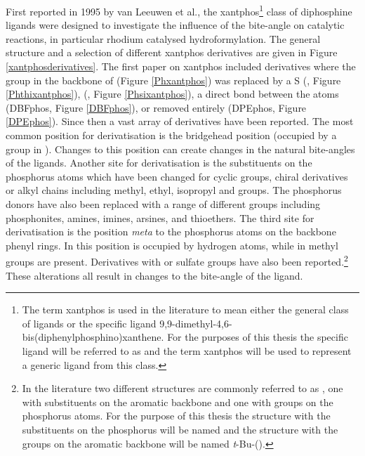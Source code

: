 First reported in 1995 by van Leeuwen et al., the \acrshort{xantphos}\footnote{The term xantphos is used in the literature to mean either the general class of ligands or the specific ligand 9,9-dimethyl-4,6-bis(diphenylphosphino)xanthene.  For the purposes of this thesis the specific ligand will be referred to as \Phxantphos{} and the term xantphos will be used to represent a generic ligand from this class.} class of diphosphine ligands were designed to investigate the influence of the bite-angle on catalytic reactions, in particular rhodium catalysed hydroformylation.\cite{Kranenburg1995}  The general structure and a selection of different xantphos derivatives are given in Figure \ref{xantphosderivatives}.  The first paper on xantphos included derivatives where the  group in the backbone of \Phxantphos{} (Figure \ref{Phxantphos}) was replaced by a S (\Phthixantphos, Figure \ref{Phthixantphos}),  (\Phsixantphos, Figure \ref{Phsixantphos}), a direct bond between the atoms (DBFphos, Figure \ref{DBFphos}), or removed entirely (DPEphos, Figure \ref{DPEphos}).  Since then a vast array of derivatives have been reported.  The most common position for derivatisation is the bridgehead position (occupied by a  group in \Phxantphos{}).  Changes to this position can create changes in the natural bite-angles of the ligands.  Another site for derivatisation is the substituents on the phosphorus atoms which have been changed for cyclic groups, chiral derivatives or alkyl chains including methyl, ethyl, isopropyl and \tBu{} groups.  The phosphorus donors have also been replaced with a range of different groups including phosphonites, amines, imines, arsines, and thioethers.\cite{Veen2000b, Malaise2006, Goertz1998, Haaren2002} The third site for derivatisation is the position \emph{meta} to the phosphorus atoms on the backbone phenyl rings.  In \Phxantphos{} this position is occupied by hydrogen atoms, while in \Phthixantphos{} methyl groups are present.  Derivatives with \tBu{} or sulfate groups have also been reported.\cite{Goedheijt1998, Goedheijt1998b, Veen1999}\footnote{In the literature two different structures are commonly referred to as  \tBuxantphos{}, one with \tBu{} substituents on the aromatic backbone and one with \tBu{} groups on the phosphorus atoms.  For the purpose of this thesis the structure with the \tBu{} substituents on the phosphorus will be named \tBuxantphos{} and the structure with the \tBu{} groups on the aromatic backbone will be named \emph{t}-Bu-(\Phxantphos).}  These alterations all result in changes to the bite-angle of the ligand.  

